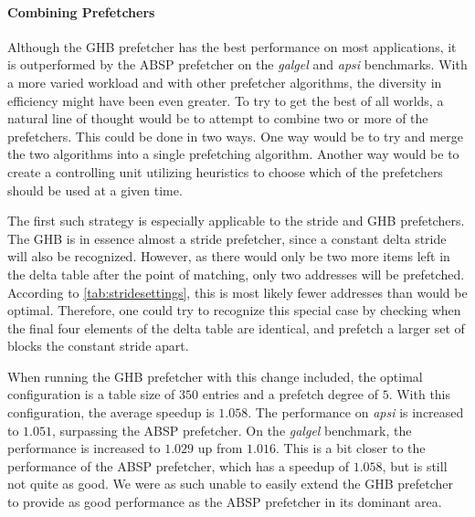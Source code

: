 \paragraph{Combining Prefetchers}
\label{par:prefcombo}
Although the GHB prefetcher has the best performance on most
applications, it is outperformed by the ABSP prefetcher on the \emph{galgel}
and \emph{apsi} benchmarks. With a more varied workload and with other
prefetcher algorithms, the diversity in efficiency might have been
even greater. To try to get the best of all worlds, a natural line of
thought would be to attempt to combine two or more of the
prefetchers. This could be done in two ways. One way would be to try
and merge the two algorithms into a single prefetching
algorithm. Another way would be to create a controlling unit utilizing
heuristics to choose which of the prefetchers should be used at a
given time.

The first such strategy is especially applicable to the stride and GHB
prefetchers. The GHB is in essence almost a stride prefetcher, since a
constant delta stride will also be recognized. However, as there would
only be two more items left in the delta table after the point of
matching, only two addresses will be prefetched. According to
\autoref{tab:stridesettings}, this is most likely fewer addresses than
would be optimal. Therefore, one could try to recognize this special
case by checking when the final four elements of the delta table are
identical, and prefetch a larger set of blocks the constant stride
apart.

When running the GHB prefetcher with this change included, the optimal
configuration is a table size of $350$ entries and a prefetch degree
of $5$. With this configuration, the average speedup is $1.058$. The
performance on \emph{apsi} is increased to $1.051$, surpassing the ABSP
prefetcher. On the \emph{galgel} benchmark, the performance is increased to
$1.029$ up from $1.016$. This is a bit closer to the performance of
the ABSP prefetcher, which has a speedup of $1.058$, but is still not
quite as good. We were as such unable to easily extend the GHB
prefetcher to provide as good performance as the ABSP prefetcher in
its dominant area.
